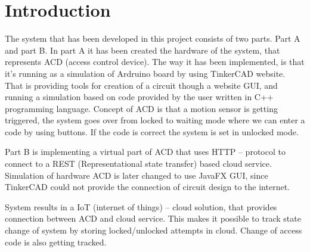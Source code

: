 \newpage 
\section{Introduction}
\label{sec:Introduction}
The system that has been developed in this project consists of two parts. Part A and part B. In part A it has been created the hardware of the system, that represents ACD (access control device). The way it has been implemented, is that it’s running as a simulation of Ardruino board by using TinkerCAD website. That is providing tools for creation of a circuit though a website GUI, and running a simulation based on code provided by the user written in C++ programming language. Concept of ACD is that a motion sensor is getting triggered, the system goes over from locked to waiting mode where we can enter a code by using buttons. If the code is correct the system is set in unlocked mode.   

Part B is implementing a virtual part of ACD that uses HTTP – protocol to connect to a REST (Representational state transfer) based cloud service. Simulation of hardware ACD is later changed to use JavaFX GUI, since TinkerCAD could not provide the connection of circuit design to the internet.

System results in a IoT (internet of things) – cloud solution, that provides connection between ACD and cloud service. This makes it possible to track state change of system by storing locked/unlocked attempts in cloud. Change of access code is also getting tracked.


